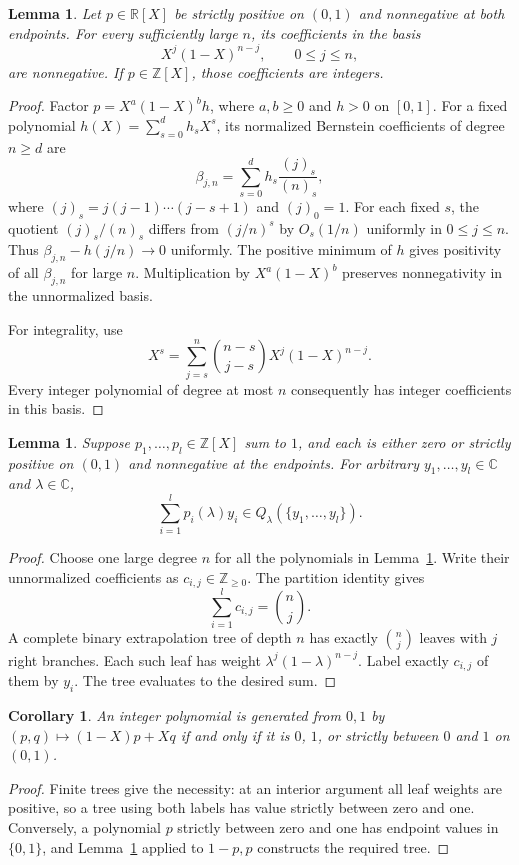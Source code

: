 \documentclass[11pt]{article}
\newtheorem{lemma}[theorem]{Lemma}
\newtheorem{corollary}[theorem]{Corollary}
\theoremstyle{remark}
\newcommand{\Z}{\mathbb Z}
\newcommand{\R}{\mathbb R}
\newcommand{\C}{\mathbb C}
\begin{document}
\begin{lemma}\label{lem:positive}
Let $p\in\R[X]$ be strictly positive on $(0,1)$ and nonnegative at both endpoints. For every sufficiently large $n$, its coefficients in the basis
\[
 X^j(1-X)^{n-j},\qquad 0\le j\le n,
\]
are nonnegative. If $p\in\Z[X]$, those coefficients are integers.
\end{lemma}
\begin{proof}
Factor $p=X^a(1-X)^b h$, where $a,b\ge0$ and $h>0$ on $[0,1]$. For a fixed polynomial $h(X)=\sum_{s=0}^d h_sX^s$, its normalized Bernstein coefficients of degree $n\ge d$ are
\[
 \beta_{j,n}=\sum_{s=0}^d h_s\frac{(j)_s}{(n)_s},
\]
where $(j)_s=j(j-1)\cdots(j-s+1)$ and $(j)_0=1$. For each fixed $s$, the quotient $(j)_s/(n)_s$ differs from $(j/n)^s$ by $O_s(1/n)$ uniformly in $0\le j\le n$. Thus $\beta_{j,n}-h(j/n)\to0$ uniformly. The positive minimum of $h$ gives positivity of all $\beta_{j,n}$ for large $n$. Multiplication by $X^a(1-X)^b$ preserves nonnegativity in the unnormalized basis.

For integrality, use
\[
 X^s=\sum_{j=s}^n\binom{n-s}{j-s}X^j(1-X)^{n-j}.
\]
Every integer polynomial of degree at most $n$ consequently has integer coefficients in this basis.
\end{proof}

\begin{lemma}\label{lem:tree}
Suppose $p_1,\ldots,p_l\in\Z[X]$ sum to $1$, and each is either zero or strictly positive on $(0,1)$ and nonnegative at the endpoints. For arbitrary $y_1,\ldots,y_l\in\C$ and $\lambda\in\C$,
\[
 \sum_{i=1}^l p_i(\lambda)y_i\in Q_\lambda(\{y_1,\ldots,y_l\}).
\]
\end{lemma}
\begin{proof}
Choose one large degree $n$ for all the polynomials in Lemma~\ref{lem:positive}. Write their unnormalized coefficients as $c_{i,j}\in\Z_{\ge0}$. The partition identity gives
\[
 \sum_{i=1}^l c_{i,j}=\binom nj.
\]
A complete binary extrapolation tree of depth $n$ has exactly $\binom nj$ leaves with $j$ right branches. Each such leaf has weight $\lambda^j(1-\lambda)^{n-j}$. Label exactly $c_{i,j}$ of them by $y_i$. The tree evaluates to the desired sum.
\end{proof}

\begin{corollary}\label{cor:polynomials}
An integer polynomial is generated from $0,1$ by $(p,q)\mapsto(1-X)p+Xq$ if and only if it is $0$, $1$, or strictly between $0$ and $1$ on $(0,1)$.
\end{corollary}
\begin{proof}
Finite trees give the necessity: at an interior argument all leaf weights are positive, so a tree using both labels has value strictly between zero and one. Conversely, a polynomial $p$ strictly between zero and one has endpoint values in $\{0,1\}$, and Lemma~\ref{lem:tree} applied to $1-p,p$ constructs the required tree.
\end{proof}
\end{document}
